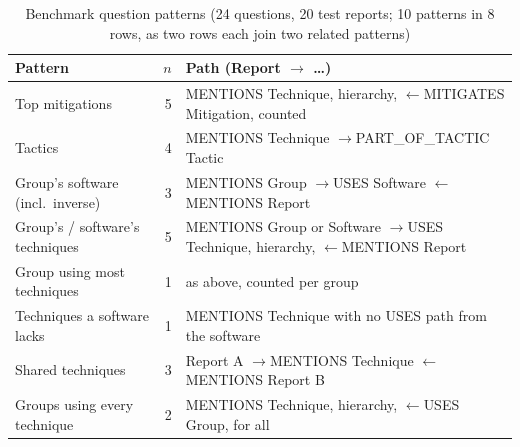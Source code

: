 \documentclass[conference,letterpaper]{IEEEtran}
\begin{document}
\begin{table}[t]\centering\footnotesize
\caption{Benchmark question patterns (24 questions, 20 test reports; 10 patterns in 8 rows, as two rows each join two related patterns)}\label{tab:patterns}
\setlength{\tabcolsep}{3pt}
\begin{tabularx}{\linewidth}{@{}>{\raggedright\arraybackslash}p{2.75cm} r >{\raggedright\arraybackslash}X@{}}
\toprule
Pattern & $n$ & Path (Report $\rightarrow$ \ldots)\\
\midrule
Top mitigations & 5 & MENTIONS Technique, hierarchy, $\leftarrow$MITIGATES Mitigation, counted\\
Tactics & 4 & MENTIONS Technique $\rightarrow$PART\_OF\_TACTIC Tactic\\
Group's software (incl.\ inverse) & 3 & MENTIONS Group $\rightarrow$USES Software $\leftarrow$MENTIONS Report\\
Group's / software's techniques & 5 & MENTIONS Group or Software $\rightarrow$USES Technique, hierarchy, $\leftarrow$MENTIONS Report\\
Group using most techniques & 1 & as above, counted per group\\
Techniques a software lacks & 1 & MENTIONS Technique with no USES path from the software\\
Shared techniques & 3 & Report A $\rightarrow$MENTIONS Technique $\leftarrow$MENTIONS Report B\\
Groups using every technique & 2 & MENTIONS Technique, hierarchy, $\leftarrow$USES Group, for all\\
\bottomrule
\end{tabularx}
\end{table}
\end{document}
